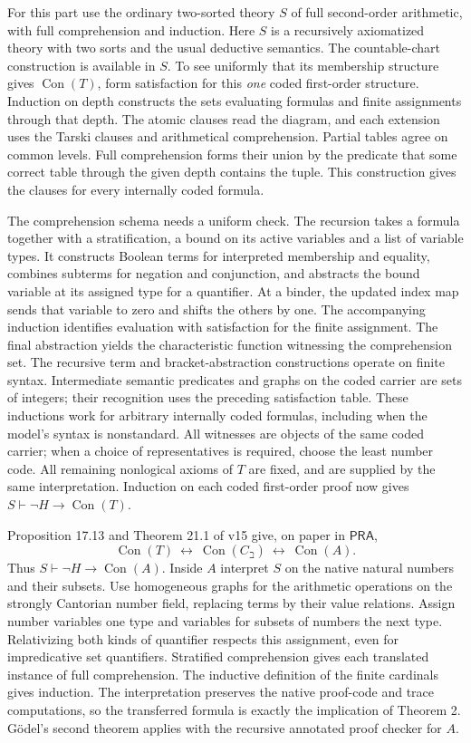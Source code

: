 \documentclass[10pt,a4paper]{article}
\newcommand{\Con}{\operatorname{Con}}\newcommand{\PA}{\mathsf{PA}}\newcommand{\PRA}{\mathsf{PRA}}\newcommand{\Z}{\mathsf{Z}}\newcommand{\NF}{\mathsf{NF}}\newcommand{\Ax}{\mathsf{AxCount}}\newcommand{\BB}{\operatorname{BB}}\newcommand{\ACA}{\mathsf{ACA}_0}
\newcommand{\id}[1]{\texttt{\small\detokenize{#1}}}
\newcommand{\hd}[1]{\par\vspace{3pt}{\large\bfseries\color{ink}#1}\par}
\begin{document}
\hd{5. The NF + Counting row and actual nonhalting}
For this part use the ordinary two-sorted theory $S$ of full second-order arithmetic, with full comprehension and induction. Here $S$ is a recursively axiomatized theory with two sorts and the usual deductive semantics. The countable-chart construction is available in $S$. To see uniformly that its membership structure gives $\Con(T)$, form satisfaction for this \emph{one} coded first-order structure. Induction on depth constructs the sets evaluating formulas and finite assignments through that depth. The atomic clauses read the diagram, and each extension uses the Tarski clauses and arithmetical comprehension. Partial tables agree on common levels. Full comprehension forms their union by the predicate that some correct table through the given depth contains the tuple. This construction gives the clauses for every internally coded formula.

The comprehension schema needs a uniform check. The recursion \id{FunctionCut.term} takes a formula together with a stratification, a bound on its active variables and a list of variable types. It constructs Boolean terms for interpreted membership and equality, combines subterms for negation and conjunction, and abstracts the bound variable at its assigned type for a quantifier. At a binder, the updated index map sends that variable to zero and shifts the others by one. The accompanying induction identifies evaluation with satisfaction for the finite assignment. The final abstraction yields the characteristic function witnessing the comprehension set. The recursive term and bracket-abstraction constructions operate on finite syntax. Intermediate semantic predicates and graphs on the coded carrier are sets of integers; their recognition uses the preceding satisfaction table. These inductions work for arbitrary internally coded formulas, including when the model's syntax is nonstandard. All witnesses are objects of the same coded carrier; when a choice of representatives is required, choose the least number code. All remaining nonlogical axioms of $T$ are fixed, and are supplied by the same interpretation. Induction on each coded first-order proof now gives $S\vdash\neg H\to\Con(T)$.

Proposition 17.13 and Theorem 21.1 of v15 give, on paper in $\PRA$,
\[
                         \Con(T)\ \longleftrightarrow\ \Con(C_{\beth})
                         \ \longleftrightarrow\ \Con(A).
\]
Thus $S\vdash\neg H\to\Con(A)$. Inside $A$ interpret $S$ on the native natural numbers and their subsets. Use homogeneous graphs for the arithmetic operations on the strongly Cantorian number field, replacing terms by their value relations. Assign number variables one type and variables for subsets of numbers the next type. Relativizing both kinds of quantifier respects this assignment, even for impredicative set quantifiers. Stratified comprehension gives each translated instance of full comprehension. The inductive definition of the finite cardinals gives induction. The interpretation preserves the native proof-code and trace computations, so the transferred formula is exactly the implication of Theorem 2. Gödel's second theorem applies with the recursive annotated proof checker for $A$.
\end{document}
